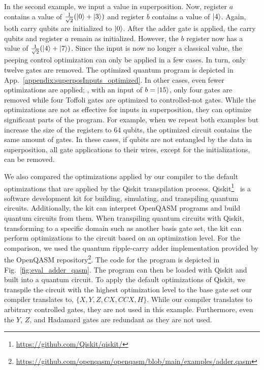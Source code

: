 In the second example, we input a value in superposition. Now, register $a$ contains a value of $\frac{1}{\sqrt{2}} (\ket{0} + \ket{3})$ and register $b$ contains a value of $\ket{4}$. Again, both carry qubits are initialized to $\ket{0}$. After the adder gate is applied, the carry qubits and register $a$ remain as initialized. However, the $b$ register now has a value of $\frac{1}{\sqrt{2}} (\ket{4} + \ket{7})$.
Since the input is now no longer a classical value, the peeping control optimization can only be applied in a few cases. In turn, only twelve gates are removed. The optimized quantum program is depicted in App.~\ref{appendix:superposInputs_optimized}. In other cases, even fewer optimizations are applied; \eg, with an input of $b = \ket{15}$, only four gates are removed while four Toffoli gates are optimized to controlled-not gates.
While the optimizations are not as effective for inputs in superposition, they can optimize significant parts of the program. For example, when we repeat both examples but increase the size of the registers to $64$ qubits, the optimized circuit contains the same amount of gates. In these cases, if qubits are not entangled by the data in superposition, all gate applications to their wires, except for the initializations, can be removed.

We also compared the optimizations applied by our compiler to the default optimizations that are applied by the Qiskit transpilation process. Qiskit\footnote{\url{https://github.com/Qiskit/qiskit/}}~\cite{JTK*24} is a software development kit for building, simulating, and transpiling quantum circuits. Additionally, the kit can interpret OpenQASM programs and build quantum circuits from them. When transpiling quantum circuits with Qiskit, \ie transforming to a specific domain such as another basis gate set, the kit can perform optimizations to the circuit based on an optimization level. For the comparison, we used the quantum ripple-carry adder implementation provided by the OpenQASM repository\footnote{\url{https://github.com/openqasm/openqasm/blob/main/examples/adder.qasm}}. The code for the program is depicted in Fig.~\ref{fig:eval_adder_qasm}. The program can then be loaded with Qiskit and built into a quantum circuit. To apply the default optimizations of Qiskit, we transpile the circuit with the highest optimization level to the base gate set our compiler translates to, \ie $\{X, Y, Z, CX, CCX, H\}$. While our compiler translates to arbitrary controlled gates, they are not used in this example. Furthermore, even the $Y$, $Z$, and Hadamard gates are redundant as they are not used.

